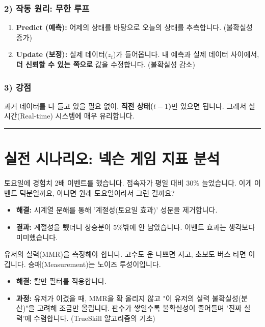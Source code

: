 \documentclass[11pt,a4paper]{book}
\theoremstyle{definition}
\begin{document}
\subsubsection*{2) 작동 원리: 무한 루프}
\begin{enumerate}
    \item \textbf{Predict (예측):} 어제의 상태를 바탕으로 오늘의 상태를 추측합니다. (불확실성 증가)
    \item \textbf{Update (보정):} 실제 데이터($z_t$)가 들어옵니다. 내 예측과 실제 데이터 사이에서, \textbf{더 신뢰할 수 있는 쪽으로} 값을 수정합니다. (불확실성 감소)
\end{enumerate}

\subsubsection*{3) 강점}
과거 데이터를 다 들고 있을 필요 없이, \textbf{직전 상태($t-1$)}만 있으면 됩니다. 그래서 실시간(Real-time) 시스템에 매우 유리합니다.

\vspace{0.5cm}\hrule\vspace{0.5cm}

\section{실전 시나리오: 넥슨 게임 지표 분석}

\begin{storybox}[title={Scenario 1: 주말 이벤트 효과 분석 (Decomposition)}]
토요일에 경험치 2배 이벤트를 했습니다. 접속자가 평일 대비 30\% 늘었습니다. 이게 이벤트 덕분일까요, 아니면 원래 토요일이라서 그런 걸까요?
\end{storybox}
\begin{itemize}
    \item \textbf{해결:} 시계열 분해를 통해 '계절성(토요일 효과)' 성분을 제거합니다.
    \item \textbf{결과:} 계절성을 뺐더니 상승분이 5\%밖에 안 남았습니다. 이벤트 효과는 생각보다 미미했습니다.
\end{itemize}

\begin{storybox}[title={Scenario 2: 매치메이킹 시스템 (Kalman Filter)}]
유저의 실력(MMR)을 측정해야 합니다. 고수도 운 나쁘면 지고, 초보도 버스 타면 이깁니다. 승패(Measurement)는 노이즈 투성이입니다.
\end{storybox}
\begin{itemize}
    \item \textbf{해결:} 칼만 필터를 적용합니다.
    \item \textbf{과정:} 유저가 이겼을 때, MMR을 확 올리지 않고 "이 유저의 실력 불확실성(분산)"을 고려해 조금만 올립니다. 판수가 쌓일수록 불확실성이 줄어들며 '진짜 실력'에 수렴합니다. (TrueSkill 알고리즘의 기초)
\end{itemize}
\end{document}
